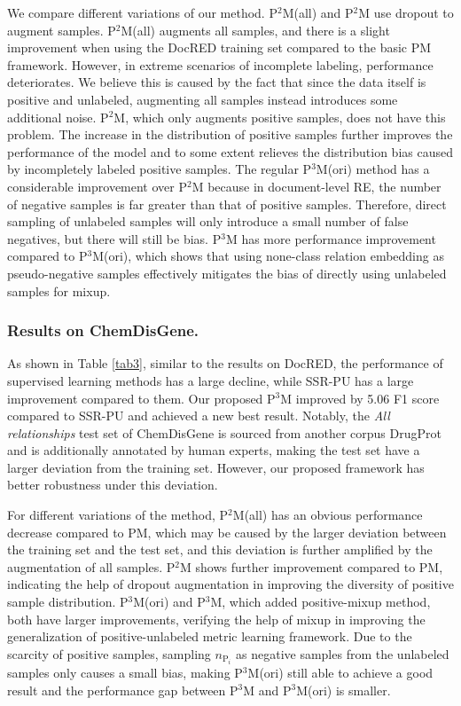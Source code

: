 \documentclass[letterpaper]{article}
\begin{document}
We compare different variations of our method. P$^{2}$M(all) and P$^{2}$M use dropout to augment samples. P$^{2}$M(all) augments all samples, and there is a slight improvement when using the DocRED training set compared to the basic PM framework. However, in extreme scenarios of incomplete labeling, performance deteriorates. We believe this is caused by the fact that since the data itself is positive and unlabeled, augmenting all samples instead introduces some additional noise. P$^{2}$M, which only augments positive samples, does not have this problem. The increase in the distribution of positive samples further improves the performance of the model and to some extent relieves the distribution bias caused by incompletely labeled positive samples. The regular P$^{3}$M(ori) method has a considerable improvement over P$^{2}$M because in document-level RE, the number of negative samples is far greater than that of positive samples. Therefore, direct sampling of unlabeled samples will only introduce a small number of false negatives, but there will still be bias. P$^{3}$M has more performance improvement compared to P$^{3}$M(ori), which shows that using none-class relation embedding as pseudo-negative samples effectively mitigates the bias of directly using unlabeled samples for mixup.

\subsubsection{Results on ChemDisGene.}
As shown in Table \ref{tab3}, similar to the results on DocRED, the performance of supervised learning methods has a large decline, while SSR-PU has a large improvement compared to them. Our proposed P$^{3}$M improved by 5.06 F1 score compared to SSR-PU and achieved a new best result. Notably, the \emph{All relationships} test set of ChemDisGene is sourced from another corpus DrugProt ~\cite{miranda2021overview} and is additionally annotated by human experts, making the test set have a larger deviation from the training set. However, our proposed framework has better robustness under this deviation.

For different variations of the method, P$^2$M(all) has an obvious performance decrease compared to PM, which may be caused by the larger deviation between the training set and the test set, and this deviation is further amplified by the augmentation of all samples. P$^2$M shows further improvement compared to PM, indicating the help of dropout augmentation in improving the diversity of positive sample distribution. P$^3$M(ori) and P$^3$M, which added positive-mixup method, both have larger improvements, verifying the help of mixup in improving the generalization of positive-unlabeled metric learning framework. Due to the scarcity of positive samples, sampling $n_{\mathrm{P}_{i}}$ as negative samples from the unlabeled samples only causes a small bias, making P$^3$M(ori) still able to achieve a good result and the performance gap between P$^3$M and P$^3$M(ori) is smaller.
\end{document}
